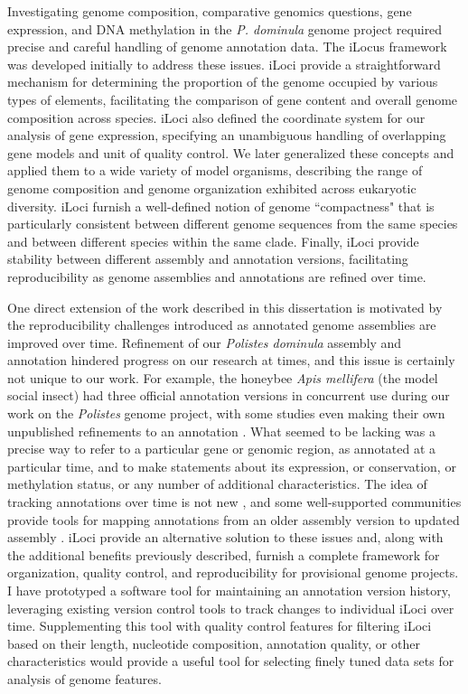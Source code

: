 Investigating genome composition, comparative genomics questions, gene expression, and DNA methylation in the \textit{P. dominula} genome project required precise and careful handling of genome annotation data.
The iLocus framework was developed initially to address these issues.
iLoci provide a straightforward mechanism for determining the proportion of the genome occupied by various types of elements, facilitating the comparison of gene content and overall genome composition across species.
iLoci also defined the coordinate system for our analysis of gene expression, specifying an unambiguous handling of overlapping gene models and unit of quality control.
We later generalized these concepts and applied them to a wide variety of model organisms, describing the range of genome composition and genome organization exhibited across eukaryotic diversity.
iLoci furnish a well-defined notion of genome ``compactness" that is particularly consistent between different genome sequences from the same species and between different species within the same clade.
Finally, iLoci provide stability between different assembly and annotation versions, facilitating reproducibility as genome assemblies and annotations are refined over time.

One direct extension of the work described in this dissertation is motivated by the reproducibility challenges introduced as annotated genome assemblies are improved over time.
Refinement of our \textit{Polistes dominula} assembly and annotation hindered progress on our research at times, and this issue is certainly not unique to our work.
For example, the honeybee \textit{Apis mellifera} (the model social insect) had three official annotation versions in concurrent use during our work on the \textit{Polistes} genome project, with some studies even making their own unpublished refinements to an annotation \cite{Dnmt3KD,TrueSight}.
What seemed to be lacking was a precise way to refer to a particular gene or genomic region, as annotated at a particular time, and to make statements about its expression, or conservation, or methylation status, or any number of additional characteristics.
The idea of tracking annotations over time is not new \cite{AED}, and some well-supported communities provide tools for mapping annotations from an older assembly version to updated assembly \cite{liftOver,PAGIT}.
iLoci provide an alternative solution to these issues and, along with the additional benefits previously described, furnish a complete framework for organization, quality control, and reproducibility for provisional genome projects.
I have prototyped a software tool for maintaining an annotation version history, leveraging existing version control tools to track changes to individual iLoci over time.
Supplementing this tool with quality control features for filtering iLoci based on their length, nucleotide composition, annotation quality, or other characteristics would provide a useful tool for selecting finely tuned data sets for analysis of genome features.
